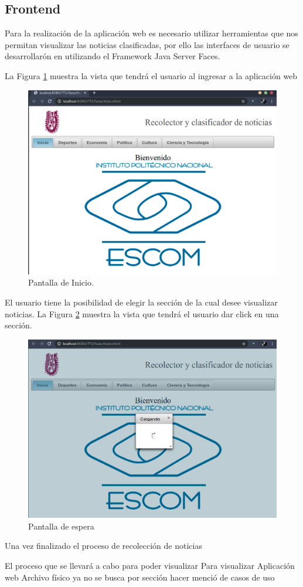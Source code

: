 \subsection{Frontend}

Para la realización de la aplicación web es necesario utilizar herramientas que nos permitan visualizar las noticias clasificadas, por ello las interfaces de usuario se desarrollarón en utilizando el Framework Java Server Faces.

La Figura \ref{fig:PantallaInicio} muestra la vista que tendrá el usuario al ingresar a la aplicación web

\begin{figure}[ht]
\centering
\includegraphics[scale=0.3]{imagenes/Capitulo5/inicio.png}
\caption{Pantalla de Inicio.}
\label{fig:PantallaInicio}
\end{figure}

El usuario tiene la posibilidad de elegir la sección de la cual desee visualizar noticias. La Figura \ref{fig:loading} muestra la vista que tendrá el usuario dar click en una sección.

\begin{figure}[ht]
\centering
\includegraphics[scale=0.3]{imagenes/Capitulo5/cargando.png}
\caption{Pantalla de espera}
\label{fig:loading}
\end{figure}

Una vez finalizado el proceso de recolección de noticias


El proceso que se llevará a cabo para poder visualizar 
Para visualizar
	Aplicación web
		Archivo físico
		ya no se busca por sección 
		hacer menció de casos de uso
